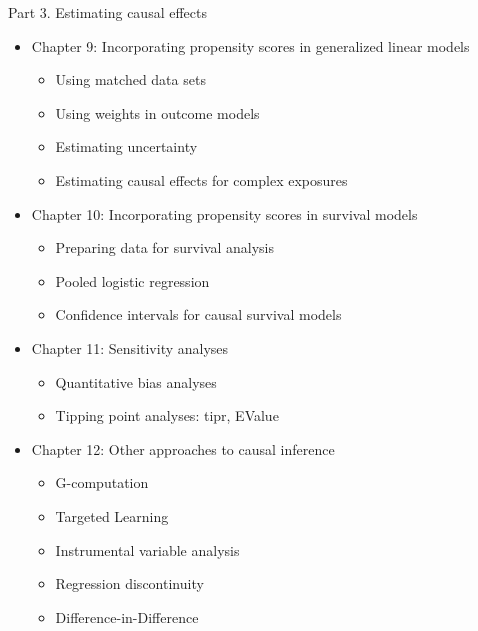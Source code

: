 \documentclass[
]{krantz}
\providecommand{\tightlist}{%
  \setlength{\itemsep}{0pt}\setlength{\parskip}{0pt}}
\begin{document}
Part 3. Estimating causal effects

\begin{itemize}
\tightlist
\item
  Chapter 9: Incorporating propensity scores in generalized linear
  models

  \begin{itemize}
  \tightlist
  \item
    Using matched data sets\\
  \item
    Using weights in outcome models\\
  \item
    Estimating uncertainty\\
  \item
    Estimating causal effects for complex exposures
  \end{itemize}
\item
  Chapter 10: Incorporating propensity scores in survival models

  \begin{itemize}
  \tightlist
  \item
    Preparing data for survival analysis\\
  \item
    Pooled logistic regression\\
  \item
    Confidence intervals for causal survival models
  \end{itemize}
\item
  Chapter 11: Sensitivity analyses

  \begin{itemize}
  \tightlist
  \item
    Quantitative bias analyses\\
  \item
    Tipping point analyses: tipr, EValue
  \end{itemize}
\item
  Chapter 12: Other approaches to causal inference

  \begin{itemize}
  \tightlist
  \item
    G-computation\\
  \item
    Targeted Learning\\
  \item
    Instrumental variable analysis\\
  \item
    Regression discontinuity\\
  \item
    Difference-in-Difference
  \end{itemize}
\end{itemize}
\end{document}
